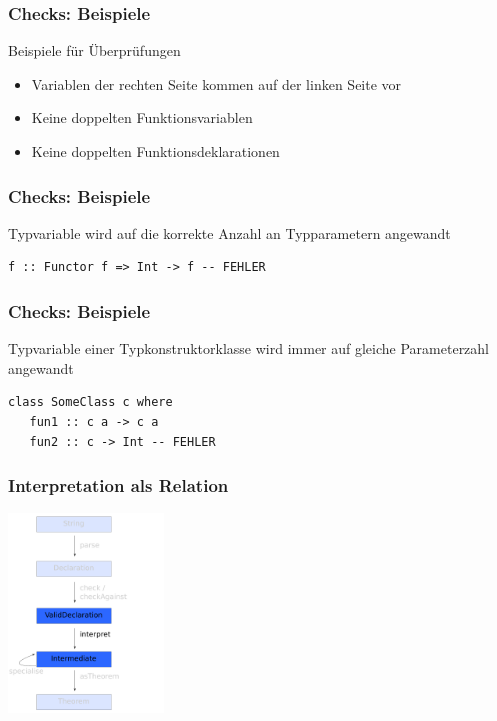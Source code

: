 \documentclass{beamer}
\begin{document}

\begin{frame}
\frametitle{Checks: Beispiele}

Beispiele für Überprüfungen

\begin{itemize}
\item Variablen der rechten Seite kommen auf der linken Seite vor
\item Keine doppelten Funktionsvariablen
\item Keine doppelten Funktionsdeklarationen
\end{itemize}

\end{frame}


\begin{frame}[fragile]
\frametitle{Checks: Beispiele}

Typvariable wird auf die korrekte Anzahl an Typparametern angewandt

\begin{verbatim}
f :: Functor f => Int -> f -- FEHLER
\end{verbatim}

\end{frame}


\begin{frame}[fragile]
\frametitle{Checks: Beispiele}

Typvariable einer Typkonstruktorklasse wird immer auf gleiche Parameterzahl angewandt

\begin{verbatim}
class SomeClass c where
   fun1 :: c a -> c a
   fun2 :: c -> Int -- FEHLER
\end{verbatim}

\end{frame}


\begin{frame}
\frametitle{Interpretation als Relation}
\begin{center}
\includegraphics[height=200px]{overview-free-theorems-interpret}
\end{center}
\end{frame}
\end{document}
